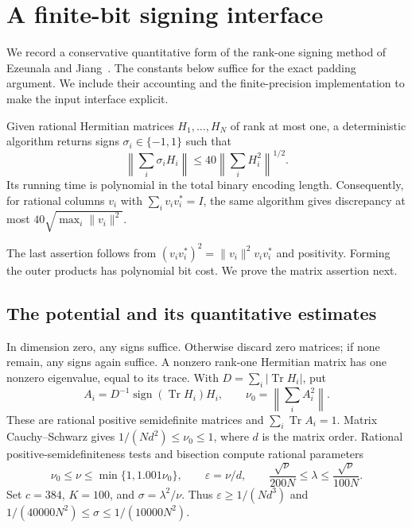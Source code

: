\section{A finite-bit signing interface}
\label{app:signing}

We record a conservative quantitative form of the rank-one signing
method of Ezeunala and Jiang~\cite{EzeunalaJiang2026}.  The constants
below suffice for the exact padding argument.  We include their
accounting and the finite-precision implementation to make the input
interface explicit.

\begin{theorem}
\label{thm:rational-signing}
Given rational Hermitian matrices $H_1,\ldots,H_N$ of rank at most one,
a deterministic algorithm returns signs $\sigma_i\in\{-1,1\}$ such that
\[
 \left\|\sum_i\sigma_iH_i\right\|
 \le40\left\|\sum_iH_i^2\right\|^{1/2}.
\]
Its running time is polynomial in the total binary encoding length.
Consequently, for rational columns $v_i$ with $\sum_i v_iv_i^*=I$,
the same algorithm gives discrepancy at most
$40\sqrt{\max_i\|v_i\|^2}$.
\end{theorem}

The last assertion follows from
$(v_iv_i^*)^2=\|v_i\|^2v_iv_i^*$ and positivity.  Forming the outer
products has polynomial bit cost.  We prove the matrix assertion next.

\subsection{The potential and its quantitative estimates}

In dimension zero, any signs suffice.  Otherwise discard zero matrices;
if none remain, any signs again suffice.  A nonzero
rank-one Hermitian matrix has one nonzero eigenvalue, equal to its
trace.  With $D=\sum_i|\operatorname{Tr}H_i|$, put
\[
 A_i=D^{-1}\operatorname{sign}(\operatorname{Tr}H_i)H_i,
 \qquad \nu_0=\left\|\sum_iA_i^2\right\|.
\]
These are rational positive semidefinite matrices and
$\sum_i\operatorname{Tr}A_i=1$.  Matrix Cauchy--Schwarz gives
$1/(Nd^2)\le\nu_0\le1$, where $d$ is the matrix order.  Rational
positive-semidefiniteness tests and bisection compute rational parameters
\[
 \nu_0\le\nu\le\min\{1,1.001\nu_0\},\qquad
 \varepsilon=\nu/d,\qquad
 \frac{\sqrt\nu}{200N}\le\lambda\le\frac{\sqrt\nu}{100N}.
\]
Set $c=384$, $K=100$, and $\sigma=\lambda^2/\nu$.  Thus
$\varepsilon\ge1/(Nd^3)$ and
$1/(40000N^2)\le\sigma\le1/(10000N^2)$.

